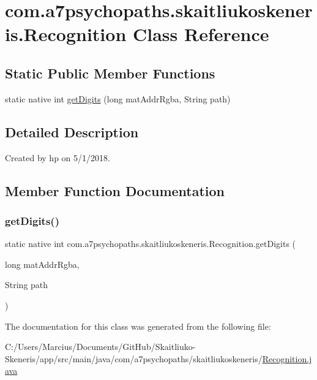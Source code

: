 \hypertarget{classcom_1_1a7psychopaths_1_1skaitliukoskeneris_1_1_recognition}{}\section{com.\+a7psychopaths.\+skaitliukoskeneris.\+Recognition Class Reference}
\label{classcom_1_1a7psychopaths_1_1skaitliukoskeneris_1_1_recognition}
\subsection*{Static Public Member Functions}
\begin{DoxyCompactItemize}
\item 
static native int \mbox{\hyperlink{classcom_1_1a7psychopaths_1_1skaitliukoskeneris_1_1_recognition_aca893ff3f71ed840837b2c8f1b8f2e50}{get\+Digits}} (long mat\+Addr\+Rgba, String path)
\end{DoxyCompactItemize}


\subsection{Detailed Description}
Created by hp on 5/1/2018. 

\subsection{Member Function Documentation}
\mbox{\label{classcom_1_1a7psychopaths_1_1skaitliukoskeneris_1_1_recognition_aca893ff3f71ed840837b2c8f1b8f2e50}} 
\subsubsection{\texorpdfstring{get\+Digits()}{getDigits()}}
{\footnotesize\ttfamily static native int com.\+a7psychopaths.\+skaitliukoskeneris.\+Recognition.\+get\+Digits (\begin{DoxyParamCaption}\item[{long}]{mat\+Addr\+Rgba,  }\item[{String}]{path }\end{DoxyParamCaption})\hspace{0.3cm}{\ttfamily [static]}}



The documentation for this class was generated from the following file\+:\begin{DoxyCompactItemize}
\item 
C\+:/\+Users/\+Marcius/\+Documents/\+Git\+Hub/\+Skaitliuko-\/\+Skeneris/app/src/main/java/com/a7psychopaths/skaitliukoskeneris/\mbox{\hyperlink{_recognition_8java}{Recognition.\+java}}\end{DoxyCompactItemize}
